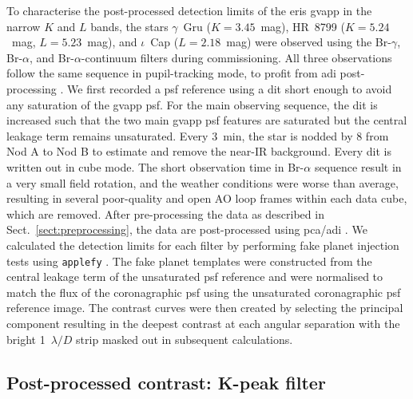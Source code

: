 \documentclass{aa}
\begin{document}
%
To characterise the post-processed detection limits of the \ac{eris} \ac{gvapp} in the narrow $K$ and $L$ bands, the stars $\gamma$~Gru ($K=3.45$~mag), HR~8799 ($K=5.24$~mag, $L=5.23$~mag), and $\iota$~Cap ($L=2.18$~mag) were observed using the Br-$\gamma$, Br-$\alpha$, and Br-$\alpha$-continuum filters during commissioning. 
%
All three observations follow the same sequence in pupil-tracking mode, to profit from \ac{adi} post-processing \citep[][]{2006ApJ...641..556M}.
%
We first recorded a \ac{psf} reference using a \ac{dit} short enough to avoid any saturation of the \ac{gvapp} \ac{psf}.
%
For the main observing sequence, the \ac{dit} is increased such that the two main \ac{gvapp} \ac{psf} features are saturated but the central leakage term remains unsaturated.
%
Every 3~min, the star is nodded by 8\arcsec{} from Nod A to Nod B to estimate and remove the near-IR background.
%
Every \ac{dit} is written out in cube mode. 
%
The short observation time in Br-$\alpha$ sequence result in a very small field rotation, and the weather conditions were worse than average, resulting in several poor-quality and open AO loop frames within each data cube, which are removed. 
%
After pre-processing the data as described in Sect.~\ref{sect:preprocessing}, the data are post-processed using \ac{pca}/\ac{adi} \citep{Amara2012PYNPOINTexoplanets}.
%
We calculated the detection limits for each filter by performing fake planet injection tests using \texttt{applefy} \citep{Bonse2023ComparingNoise}.
%
The fake planet templates were constructed from the central leakage term of the unsaturated \ac{psf} reference and were normalised to match the flux of the coronagraphic \ac{psf} using the unsaturated coronagraphic \ac{psf} reference image.
%
The contrast curves were then created by selecting the principal component resulting in the deepest contrast at each angular separation \citep[i.e. optimal PCA/ADI;][]{Meshkat14} with the bright 1~$\lambda/D$ strip masked out in subsequent calculations.

\subsection{Post-processed contrast: K-peak filter}\label{processing_Kpeak}
\end{document}
